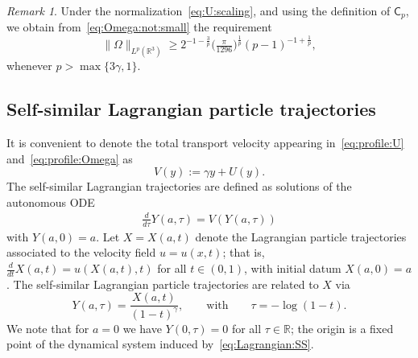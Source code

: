 \documentclass[11pt,reqno]{amsproc}
\numberwithin{equation}{section}
\theoremstyle{remark}
\newtheorem{remark}[theorem]{Remark}
\newcommand{\la}{\label}
\newcommand{\be}{\begin{equation}}
\newcommand{\ee}{\end{equation}}
\begin{document}
\begin{remark}
Under the normalization~\eqref{eq:U:scaling}, {and} using the definition of $\mathsf{C}_p$, we obtain from~\eqref{eq:Omega:not:small} the requirement
\begin{equation}
\|\Omega\|_{L^p(\mathbb{R}^3)} 
\geq 2^{- 1 - \frac{3}{p}}
\bigl( \tfrac{\pi}{1296}\bigr)^{\frac{1}{p}}  
(p-1)^{-1 + \frac{1}{p}}  , 
\label{eq:Omega:not:small:normalized}
\end{equation}
whenever $p > \max\{3\gamma,1\}$.
\end{remark}


\subsection{Self-similar Lagrangian particle trajectories}
{It is convenient to denote the total transport velocity appearing in~\eqref{eq:profile:U} and~\eqref{eq:profile:Omega} as 
\be
V(y) := \gamma y + U(y).
\la{eq:V:def}
\ee
The self-similar Lagrangian trajectories are defined as solutions of the {autonomous} ODE
\begin{align}
\frac{d}{d\tau} Y(a,\tau) = V(Y(a,\tau))
\label{eq:Lagrangian:SS}
\end{align}
with $Y(a, 0) = a$.  Let $X = X(a,t)$ denote the Lagrangian particle trajectories associated to the velocity field $u = u(x,t)$; that is, $\frac{d}{dt} X(a,t) = u(X(a,t),t)$ for all $t \in (0,1)$, with initial datum $X(a,0) = a$. The self-similar Lagrangian particle trajectories are related to $X$ via
\be
Y(a,\tau) = \frac{X(a,t)}{(1-t)^\gamma} ,
\qquad
\mbox{with}
\qquad
\tau = - \log\left(1 - t \right) .
\la{YX}
\ee
We note that for $a=0$ we have $Y(0,\tau) = 0$ for all $\tau \in \mathbb{R}$; the origin is a fixed point of the dynamical system induced by~\eqref{eq:Lagrangian:SS}.

}
\end{document}
